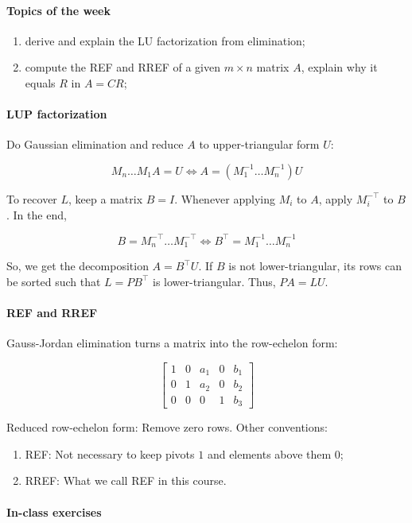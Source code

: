 \documentclass{article}
\begin{document}
\paragraph{Topics of the week} 

\begin{enumerate}
    \item derive and explain the LU factorization from elimination;
    \item compute the REF and RREF of a given $m \times n$ matrix $A$, explain why it equals $R$ in $A=CR$;
\end{enumerate}

\paragraph{LUP factorization} Do Gaussian elimination and reduce $A$ to upper-triangular form $U$:

$$
M_n \dots M_1 A = U \iff A = (M_1^{-1} \dots M_n^{-1}) U
$$

To recover $L$, keep a matrix $B = I$. Whenever applying $M_i$ to $A$, apply $M_i^{-\top}$ to $B$. In the end,

$$
B = M_n^{-\top} \dots M_1^{-\top} \iff B^\top = M_1^{-1} \dots M_n^{-1}
$$

So, we get the decomposition $A = B^\top U$. If $B$ is not lower-triangular, its rows can be sorted such that $L = P B^\top$ is lower-triangular. Thus, $PA = LU$.

\paragraph{REF and RREF} Gauss-Jordan elimination turns a matrix into the row-echelon form:

$$
\begin{bmatrix}
1 & 0 & a_1 & 0 & b_1 \\
0 & 1 & a_2 & 0 & b_2 \\
0 & 0 & 0 & 1 & b_3
\end{bmatrix}
$$

Reduced row-echelon form: Remove zero rows. Other conventions:

\begin{enumerate}
    \item REF: Not necessary to keep pivots $1$ and elements above them $0$;
    \item RREF: What we call REF in this course.
\end{enumerate}

\paragraph{In-class exercises}
\end{document}

